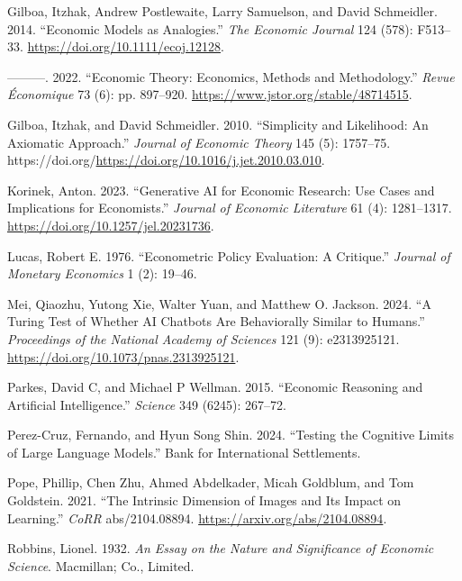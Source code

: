\documentclass[
]{article}
\newlength{\cslhangindent}
\newenvironment{CSLReferences}[2] %
 {\begin{list}{}{%
  \setlength{\itemindent}{0pt}
  \setlength{\leftmargin}{0pt}
  \setlength{\parsep}{0pt}
  \ifodd #1
   \setlength{\leftmargin}{\cslhangindent}
   \setlength{\itemindent}{-1\cslhangindent}
  \fi
  \setlength{\itemsep}{#2\baselineskip}}}
 {\end{list}}
\begin{document}
\begin{CSLReferences}{1}{0}
Gilboa, Itzhak, Andrew Postlewaite, Larry Samuelson, and David
Schmeidler. 2014. {``{Economic Models as Analogies}.''} \emph{The
Economic Journal} 124 (578): F513--33.
\url{https://doi.org/10.1111/ecoj.12128}.

---------. 2022. {``Economic Theory: Economics, Methods and
Methodology.''} \emph{Revue Économique} 73 (6): pp. 897--920.
\url{https://www.jstor.org/stable/48714515}.

Gilboa, Itzhak, and David Schmeidler. 2010. {``Simplicity and
Likelihood: An Axiomatic Approach.''} \emph{Journal of Economic Theory}
145 (5): 1757--75.
https://doi.org/\url{https://doi.org/10.1016/j.jet.2010.03.010}.

Korinek, Anton. 2023. {``Generative AI for Economic Research: Use Cases
and Implications for Economists.''} \emph{Journal of Economic
Literature} 61 (4): 1281--1317.
\url{https://doi.org/10.1257/jel.20231736}.

Lucas, Robert E. 1976. {``Econometric Policy Evaluation: A Critique.''}
\emph{Journal of Monetary Economics} 1 (2): 19--46.

Mei, Qiaozhu, Yutong Xie, Walter Yuan, and Matthew O. Jackson. 2024.
{``A Turing Test of Whether AI Chatbots Are Behaviorally Similar to
Humans.''} \emph{Proceedings of the National Academy of Sciences} 121
(9): e2313925121. \url{https://doi.org/10.1073/pnas.2313925121}.

Parkes, David C, and Michael P Wellman. 2015. {``Economic Reasoning and
Artificial Intelligence.''} \emph{Science} 349 (6245): 267--72.

Perez-Cruz, Fernando, and Hyun Song Shin. 2024. {``Testing the Cognitive
Limits of Large Language Models.''} Bank for International Settlements.

Pope, Phillip, Chen Zhu, Ahmed Abdelkader, Micah Goldblum, and Tom
Goldstein. 2021. {``The Intrinsic Dimension of Images and Its Impact on
Learning.''} \emph{CoRR} abs/2104.08894.
\url{https://arxiv.org/abs/2104.08894}.

Robbins, Lionel. 1932. \emph{An Essay on the Nature and Significance of
Economic Science}. Macmillan; Co., Limited.


\end{CSLReferences}
\end{document}
